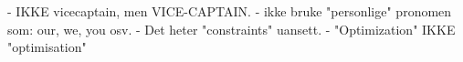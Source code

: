 - IKKE vicecaptain, men VICE-CAPTAIN. 
- ikke bruke "personlige" pronomen som: our, we, you osv. 
- Det heter "constraints" uansett. 
- "Optimization" IKKE "optimisation"
